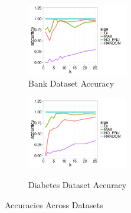 


\begin{figure}[h]
	\centering
	\vspace*{-10pt}
	\begin{subfigure}{0.48\linewidth}
		\centering
		\includegraphics[width=4.4cm] {Images/in_memory_bank_accuracy.pdf}
		\vspace{-15pt}
		\caption{Bank Dataset Accuracy}
		\label{fig:bank_accuracy}
	\end{subfigure}
	\begin{subfigure}{0.48\linewidth}
		\centering
		\includegraphics[width=4.4cm] {Images/in_memory_dia_accuracy.pdf}\
		\vspace{-15pt}
		\caption{Diabetes Dataset Accuracy}
		\label{fig:dia_accuracy}
	\end{subfigure}
	\vspace{-10pt}
	\caption{Accuracies Across Datasets}
	\vspace{-10pt}
\end{figure}





